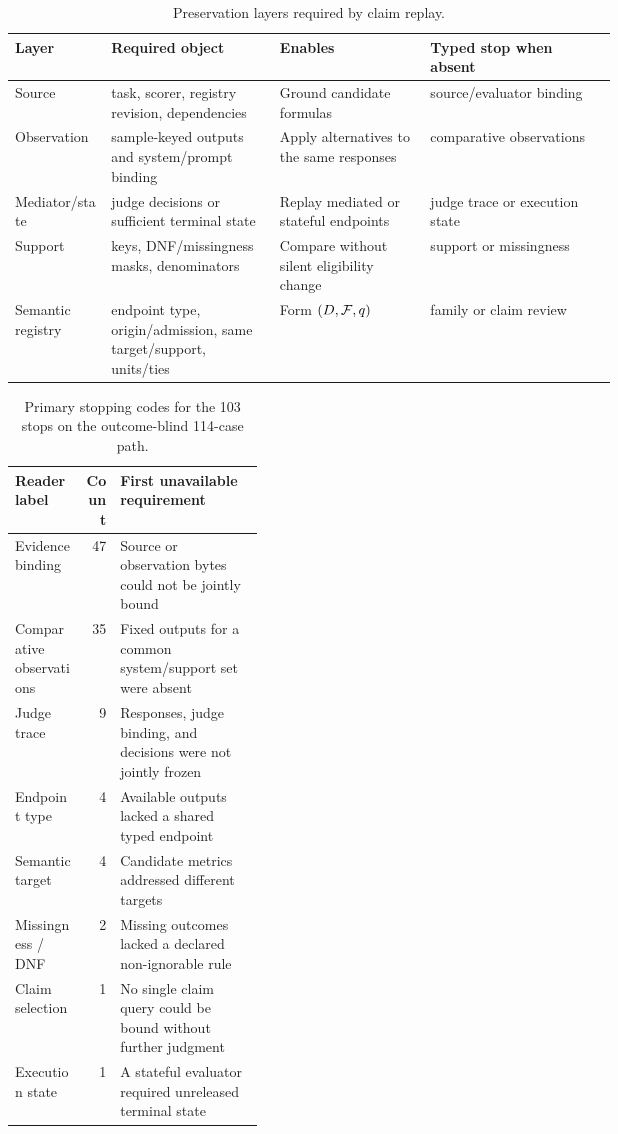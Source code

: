 \begin{table}[ht]
\centering
\caption{Preservation layers required by claim replay.}
\label{tab:reviewer-preservation-layers}
\footnotesize
\begin{tabularx}{\linewidth}{@{}p{0.16\linewidth}p{0.29\linewidth}p{0.25\linewidth}Y@{}}
\toprule Layer & Required object & Enables & Typed stop when absent \\
\midrule
Source & task, scorer, registry revision, dependencies & Ground candidate formulas & source/evaluator binding \\
Observation & sample-keyed outputs and system/prompt binding & Apply alternatives to the same responses & comparative observations \\
Mediator/state & judge decisions or sufficient terminal state & Replay mediated or stateful endpoints & judge trace or execution state \\
Support & keys, DNF/missingness masks, denominators & Compare without silent eligibility change & support or missingness \\
Semantic registry & endpoint type, origin/admission, same target/support, units/ties & Form \((D,\mathcal F,q)\) & family or claim review \\
\bottomrule
\end{tabularx}
\end{table}

\begin{table}[ht]
\centering
\caption{Primary stopping codes for the 103 stops on the outcome-blind 114-case path.}
\label{tab:reviewer-stop-taxonomy}
\footnotesize
\begin{tabularx}{\linewidth}{@{}p{0.29\linewidth}rY@{}}
\toprule Reader label & Count & First unavailable requirement \\
\midrule
Evidence binding & 47 & Source or observation bytes could not be jointly bound \\
Comparative observations & 35 & Fixed outputs for a common system/support set were absent \\
Judge trace & 9 & Responses, judge binding, and decisions were not jointly frozen \\
Endpoint type & 4 & Available outputs lacked a shared typed endpoint \\
Semantic target & 4 & Candidate metrics addressed different targets \\
Missingness / DNF & 2 & Missing outcomes lacked a declared non-ignorable rule \\
Claim selection & 1 & No single claim query could be bound without further judgment \\
Execution state & 1 & A stateful evaluator required unreleased terminal state \\
\bottomrule
\end{tabularx}
\end{table}

